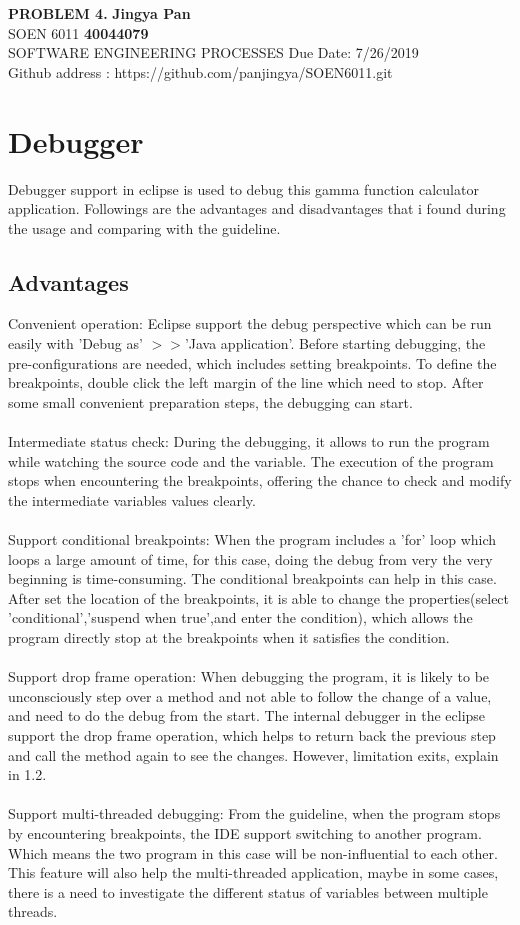 \documentclass[a4paper, 11pt]{article}
\begin{document}
\noindent
\large\textbf{PROBLEM 4.} \hfill \textbf{Jingya Pan} \\
\normalsize SOEN 6011 \hfill \textbf{40044079} \\
 SOFTWARE ENGINEERING PROCESSES \hfill Due Date: 7/26/2019 \\
\hfill Github address : https://github.com/panjingya/SOEN6011.git

\section{Debugger}
Debugger support in eclipse is used to debug this gamma function calculator application. Followings are the advantages and disadvantages that i found during the usage and comparing with the guideline.
\subsection{Advantages}
Convenient operation: Eclipse support the debug perspective which can be run easily with 'Debug as' $>>$'Java application'. Before starting debugging, the pre-configurations are needed, which includes setting breakpoints. To define the breakpoints, double click the left margin of the line which need to stop. After some small convenient preparation steps, the debugging can start.\\\\
\noindent
Intermediate status check: During the debugging, it allows to run the program while watching the source code and the variable. The execution of the program stops when encountering the breakpoints, offering the chance to check and modify the intermediate variables values clearly.\\\\
\noindent
Support conditional breakpoints: When the program includes a 'for' loop which loops a large amount of time, for this case, doing the debug from very the very beginning is time-consuming. The conditional breakpoints can help in this case.  After set the location of the breakpoints, it is able to change the properties(select 'conditional','suspend when true',and enter the condition), which allows the program directly stop at the breakpoints when it satisfies the condition.\\\\
\noindent
Support drop frame operation: When debugging the program, it is likely to be unconsciously step over a method and not able to follow the change of a value, and need to do the debug from the start. The internal debugger in the eclipse support the drop frame operation, which helps to return back the previous step and call the method again to see the changes. However, limitation exits, explain in 1.2.\\\\
\noindent
Support multi-threaded debugging: From the guideline, when the program stops by encountering breakpoints, the IDE support switching to another program. Which means the two program in this case will be non-influential to each other. This feature will also help the multi-threaded application, maybe in some cases, there is a need to investigate the different status of variables between multiple threads.
\end{document}
